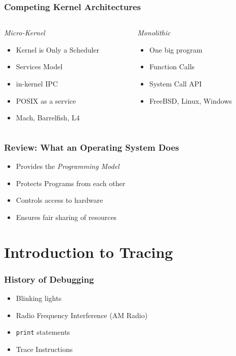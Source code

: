 \documentclass[pdftex]{beamer} %
\begin{document}
\begin{frame}
  \frametitle{Competing Kernel Architectures}
  \begin{columns}[t]
    \begin{column}{5cm}
      \emph{Micro-Kernel}
      \begin{itemize}
      \item Kernel is Only a Scheduler
      \item Services Model
      \item in-kernel IPC
      \item POSIX as a service
      \item Mach, Barrelfish, L4
      \end{itemize}
    \end{column}
    \begin{column}{5cm}
      \emph{Monolithic}
      \begin{itemize}
      \item One big program
      \item Function Calls
      \item System Call API
      \item FreeBSD, Linux, Windows
      \end{itemize}  
    \end{column}
  \end{columns}
\end{frame}

\begin{frame}
  \frametitle{Review: What an Operating System Does}
  \begin{itemize}
  \item Provides the \emph{Programming Model}
  \item Protects Programs from each other
  \item Controls access to hardware
  \item Ensures fair sharing of resources
  \end{itemize}
\end{frame}

\section{Introduction to Tracing}
\label{sec:intro-tracing}

\begin{frame}[fragile]
  \frametitle{History of Debugging}
  \begin{itemize}
  \item Blinking lights
  \item Radio Frequency Interference (AM Radio)
  \item \verb|print| statements
  \item Trace Instructions
  \end{itemize}
\end{frame}
\end{document}
